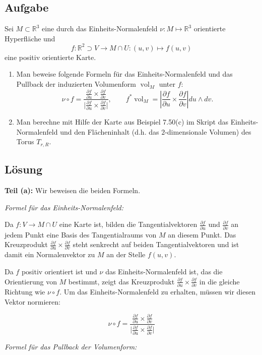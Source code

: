\documentclass{article}
\DeclareMathOperator{\vol}{vol}
\newcommand{\R}{\mathbb{R}}
\newcommand{\del}{\partial}
\begin{document}
\subsection*{Aufgabe}
Sei $M \subset \R^3$ eine durch das Einheits-Normalenfeld $\nu \colon M \mapsto \R^3$ orientierte Hyperfläche und
$$
f \colon \R^2 \supset V \to M\cap U \colon (u,v) \mapsto f(u,v)
$$
eine positiv orientierte Karte. 
\begin{enumerate}[label = (\alph*)]
	\item Man beweise folgende Formeln für das Einheits-Normalenfeld und das Pullback der induzierten Volumenform $\vol_M$ unter $f$: 
	$$
	\nu \circ f = \frac{\frac{\del f}{\del u}\times\frac{\del f}{\del v}}{\bigl|\frac{\del f}{\del u}\times\frac{\del f}{\del v}\bigr|}, \qquad
	f^* \vol_M = \left| \frac{\del f}{\del u}\times\frac{\del f}{\del v} \right| du \wedge dv. 
	$$
	\item Man berechne mit Hilfe der Karte aus Beispiel 7.50(c) im Skript das Einheits-Normalenfeld und den Flächeninhalt (d.h. das $2$-dimensionale Volumen) des Torus $T_{r,R}$. 
\end{enumerate}

\subsection*{Lösung}

\textbf{Teil (a):} Wir beweisen die beiden Formeln.

\textit{Formel für das Einheits-Normalenfeld:}

Da $f: V \to M \cap U$ eine Karte ist, bilden die Tangentialvektoren $\frac{\del f}{\del u}$ und $\frac{\del f}{\del v}$ an jedem Punkt eine Basis des Tangentialraums von $M$ an diesem Punkt. Das Kreuzprodukt $\frac{\del f}{\del u} \times \frac{\del f}{\del v}$ steht senkrecht auf beiden Tangentialvektoren und ist damit ein Normalenvektor zu $M$ an der Stelle $f(u,v)$.

Da $f$ positiv orientiert ist und $\nu$ das Einheits-Normalenfeld ist, das die Orientierung von $M$ bestimmt, zeigt das Kreuzprodukt $\frac{\del f}{\del u} \times \frac{\del f}{\del v}$ in die gleiche Richtung wie $\nu \circ f$. Um das Einheits-Normalenfeld zu erhalten, müssen wir diesen Vektor normieren:

$$\nu \circ f = \frac{\frac{\del f}{\del u}\times\frac{\del f}{\del v}}{\bigl|\frac{\del f}{\del u}\times\frac{\del f}{\del v}\bigr|}$$

\textit{Formel für das Pullback der Volumenform:}
\end{document}
